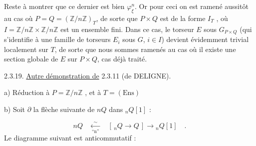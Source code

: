 Reste à montrer que ce dernier est bien $\varphi_\xi^n$. Or pour ceci on est ramené aussitôt au cas où $P=Q = (\mathbb{Z}/n\mathbb{Z})_T$, de sorte que $P \times Q$ est de la forme $I_T$ , où $I = \mathbb{Z}/n\mathbb{Z} \times \mathbb{Z}/n\mathbb{Z}$ est un ensemble fini. Dans ce cas, le torseur $E$ sous $G_{P \times Q}$ (qui s'identifie à une famille de torseurs $E_i$ sous $G$, $i \in I$) devient évidemment trivial localement sur $T$, de sorte que nous sommes ramenés au cas où il existe une section globale de $E$ sur $P \times Q$, cas déjà traité.

2.3.19.  \underline{Autre démonstration de} 2.3.11 (de DELIGNE).

a)  Réduction à $P = \mathbb{Z}/n\mathbb{Z}$ , et à $T = (\mathrm{Ens})$

b)  Soit $\partial$ la flèche suivante de $nQ$ dans ${}_nQ[1]$ :

\begin{equation*}
nQ \quad \xleftarrow[\mbox{``n''}]{\sim} \quad [\,{}_nQ \longrightarrow Q\,] \longrightarrow {}_nQ[1] \quad .
\end{equation*}
Le diagramme suivant est anticommutatif :

